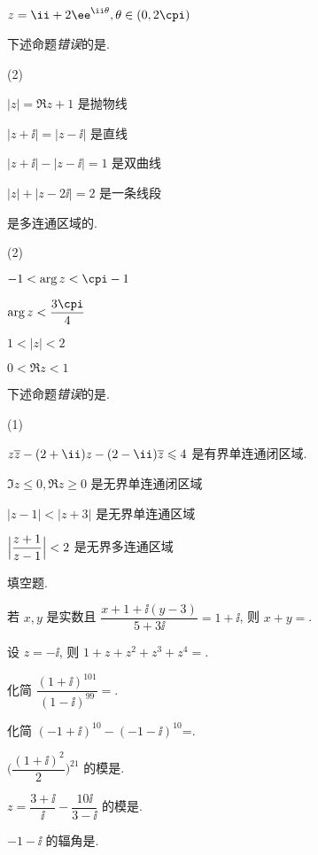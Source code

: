 \begin{homework}
\begin{homework}
\begin{exchoice}
      \item $z=\ii+2\ee^{\ii\theta},\theta\in(0,2\cpi)$
    \end{exchoice}
    \item 下述命题\emph{错误}的是\fillbrace{}.
    \begin{exchoice}(2)
      \item $|z|=\Re z+1$ 是抛物线
      \item $|z+\ii|=|z-\ii|$ 是直线
      \item $|z+\ii|-|z-\ii|=1$ 是双曲线
      \item $|z|+|z-2\ii|=2$ 是一条线段
    \end{exchoice}
    \item \fillbrace{}是多连通区域的.
    \begin{exchoice}(2)
      \item $-1<\arg z<\cpi-1$
      \item $\arg z<\dfrac{3\cpi}4$
      \item $1<|z|<2$
      \item $0<\Re z<1$
    \end{exchoice}
    \item 下述命题\emph{错误}的是\fillbrace{}.
    \begin{exchoice}(1)
      \item $z\ov z-(2+\ii)z-(2-\ii)\ov z\le 4$ 是有界单连通闭区域.
      \item $\Im z\le0,\Re z\ge0$ 是无界单连通闭区域
      \item $|z-1|<|z+3|$ 是无界单连通区域
      \item $\Bigl|\dfrac{z+1}{z-1}\Bigr|<2$ 是无界多连通区域
    \end{exchoice}
  \end{homework}
  \item 填空题.
  \begin{homework}
    \item 若 $x,y$ 是实数且 $\dfrac{x+1+\ii(y-3)}{5+3\ii}=1+\ii$, 则 $x+y=$\fillblank{}.
    \item 设 $z=-\ii$, 则 $1+z+z^2+z^3+z^4=$\fillblank{}.
    \item 化简 $\dfrac{(1+\ii)^{101}}{(1-\ii)^{99}}=$\fillblank{}.
    \item 化简 $(-1+\ii)^{10}-(-1-\ii)^{10}$=\fillblank{}.
    \item $\biggl(\dfrac{(1+\ii)^2}2\biggr)^{21}$ 的模是\fillblank{}.
    \item $z=\dfrac{3+\ii}{\ii}-\dfrac{10\ii}{3-\ii}$ 的模是\fillblank{}.
    \item $-1-\ii$ 的辐角是\fillblank{}.

\end{homework}
\end{homework}
